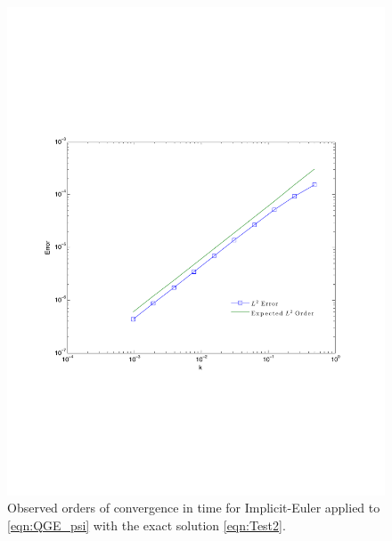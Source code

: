 \begin{figure}
  \begin{center}
    \includegraphics[scale=0.6]{Figures/expsinTimeConvergence.pdf}
    \caption{Observed orders of convergence in time for Implicit-Euler applied to
      \eqref{eqn:QGE_psi} with the exact solution \eqref{eqn:Test2}.}
  \label{fig:Test2Time}
  \end{center}
\end{figure}

